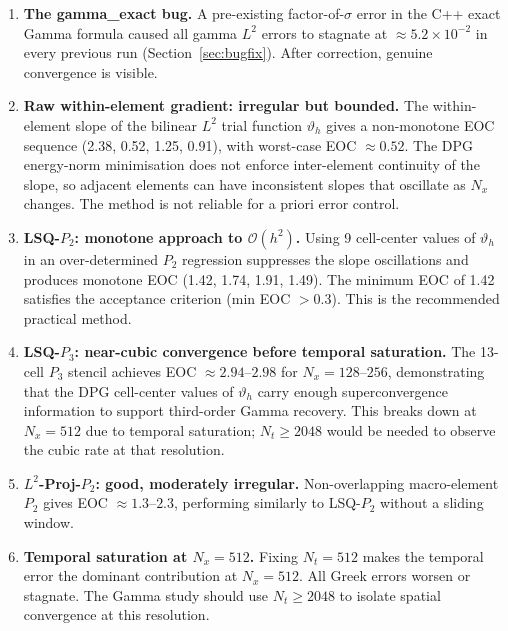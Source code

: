 \documentclass[11pt,a4paper]{article}
\newcommand{\Nx}{N_x}
\newcommand{\bigo}[1]{\mathcal{O}(#1)}
\newcommand{\vth}{\vartheta}
\begin{document}
\begin{enumerate}
  \item \textbf{The gamma\_exact bug.}
        A pre-existing factor-of-$\sigma$ error in the C++ exact Gamma
        formula caused all gamma $L^2$ errors to stagnate at
        $\approx 5.2\times10^{-2}$ in every previous run
        (Section~\ref{sec:bugfix}).  After correction, genuine convergence
        is visible.

  \item \textbf{Raw within-element gradient: irregular but bounded.}
        The within-element slope of the bilinear $L^2$ trial function
        $\vth_h$ gives a non-monotone EOC sequence (2.38, 0.52, 1.25, 0.91),
        with worst-case EOC $\approx 0.52$.  The DPG energy-norm minimisation
        does not enforce inter-element continuity of the slope, so adjacent
        elements can have inconsistent slopes that oscillate as $\Nx$ changes.
        The method is not reliable for a priori error control.

  \item \textbf{LSQ-$P_2$: monotone approach to $\bigo{h^2}$.}
        Using 9 cell-center values of $\vth_h$ in an over-determined $P_2$
        regression suppresses the slope oscillations and produces
        monotone EOC (1.42, 1.74, 1.91, 1.49).  The minimum EOC of 1.42
        satisfies the acceptance criterion (min EOC $> 0.3$).
        This is the recommended practical method.

  \item \textbf{LSQ-$P_3$: near-cubic convergence before temporal saturation.}
        The 13-cell $P_3$ stencil achieves EOC $\approx 2.94$--$2.98$
        for $\Nx = 128$--$256$, demonstrating that the DPG cell-center
        values of $\vth_h$ carry enough superconvergence information to
        support third-order Gamma recovery.  This breaks down at $\Nx = 512$
        due to temporal saturation; $N_t \ge 2048$ would be needed to
        observe the cubic rate at that resolution.

  \item \textbf{$L^2$-Proj-$P_2$: good, moderately irregular.}
        Non-overlapping macro-element $P_2$ gives EOC $\approx 1.3$--$2.3$,
        performing similarly to LSQ-$P_2$ without a sliding window.

  \item \textbf{Temporal saturation at $\Nx = 512$.}
        Fixing $N_t = 512$ makes the temporal error the dominant contribution
        at $\Nx = 512$.  All Greek errors worsen or stagnate.
        The Gamma study should use $N_t \ge 2048$ to isolate spatial
        convergence at this resolution.
\end{enumerate}
\end{document}
